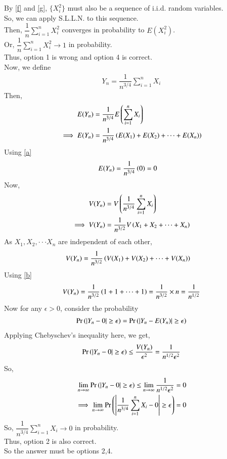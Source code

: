 \documentclass[journal,12pt,twocolumn]{IEEEtran}
\begin{document}
By \eqref{f} and \eqref{g}, $\{X_i^2\}$ must also be a sequence of i.i.d. random variables.\\
So, we can apply S.L.L.N. to this sequence.\\
Then, $\dfrac{1}{n}\sum_{i=1}^nX_i^2$ converges in probability to $E(X_i^2)$.\\
Or, $\dfrac{1}{n}\sum_{i=1}^nX_i^2 \to 1$ in probability.\\
Thus, option 1 is wrong and option 4 is correct.
\vspace{0.3cm}\\
Now, we define
\begin{align}
    Y_n=\dfrac{1}{n^{3/4}}\sum_{i=1}^nX_i
\end{align}
Then,
\begin{align}
    E(Y_n) &= \dfrac{1}{n^{3/4}}E\left(\sum_{i=1}^nX_i\right) \\
    \implies E(Y_n) &= \dfrac{1}{n^{3/4}}\left(E(X_1)+E(X_2)+ \dots +E(X_n)\right)
\end{align}
Using \eqref{a}
\begin{align}
    E(Y_n) &= \dfrac{1}{n^{3/4}}\left(0\right) =0
\end{align}
Now,
\begin{align}
    V(Y_n) &= V\left(\dfrac{1}{n^{3/4}}\sum_{i=1}^nX_i\right) \\
    \implies V(Y_n) &= \dfrac{1}{n^{3/2}}V\left(X_1+X_2+ \dots +X_n\right)
\end{align}
As $X_1, X_2, \cdot \cdot \cdot X_n$ are independent of each other,
\begin{align}
    V(Y_n) &= \dfrac{1}{n^{3/2}}\left(V(X_1)+V(X_2)+ \dots +V(X_n)\right)
\end{align}
Using \eqref{b}
\begin{align}
    V(Y_n)=\dfrac{1}{n^{3/2}}\left(1+1+ \dots +1\right)=\dfrac{1}{n^{3/2}}\times n=\dfrac{1}{n^{1/2}}
\end{align}
Now for any $\epsilon>0$, consider the probability
\begin{align}
    \Pr\left(|Y_n-0|\geq \epsilon\right)=\Pr\left(|Y_n-E(Y_n)|\geq \epsilon\right)
\end{align}
Applying Chebyschev's inequality here, we get,
\begin{align}
    \Pr\left(|Y_n-0|\geq \epsilon\right) \leq \dfrac{V(Y_n)}{\epsilon^2} = \dfrac{1}{n^{1/2}\epsilon^2}
\end{align}
So,
\begin{align}
    \lim_{n \to \infty}\Pr\left(|Y_n-0|\geq \epsilon\right) \leq \lim_{n \to \infty }\dfrac{1}{n^{1/2}\epsilon^2}=0\\
    \implies \lim_{n \to \infty}\Pr\left(\left | \dfrac{1}{n^{3/4}}\sum_{i=1}^nX_i - 0 \right|\geq \epsilon\right)=0
\end{align}
So, $\dfrac{1}{n^{3/4}}\sum_{i=1}^nX_i \to 0$ in probability.\\
Thus, option 2 is also correct.\\
So the answer must be options 2,4.
\end{document}
